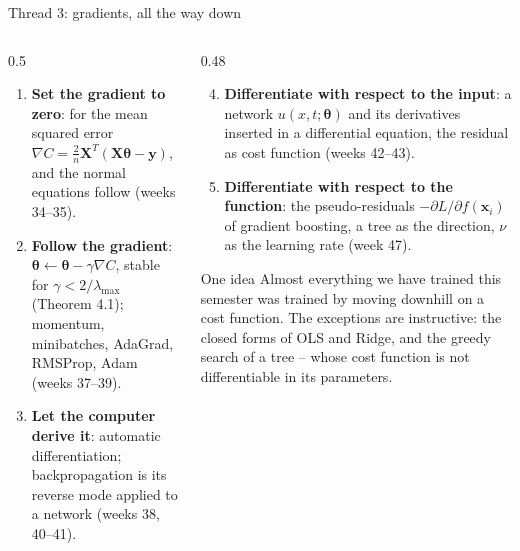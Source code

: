 \documentclass[10pt,aspectratio=169]{beamer}
\begin{document}
\begin{frame}{Thread 3: gradients, all the way down}
\begin{columns}[T]
\begin{column}{0.5\textwidth}
\small
\begin{enumerate}
  \item \textbf{Set the gradient to zero}: for the mean squared error
    $\nabla C=\frac2n\bm{X}^T(\bm{X}\bm{\theta}-\bm{y})$, and the normal
    equations follow (weeks 34--35).
  \item \textbf{Follow the gradient}:
    $\bm{\theta}\leftarrow\bm{\theta}-\gamma\nabla C$, stable for
    $\gamma<2/\lambda_{\max}$ (Theorem 4.1); momentum, minibatches,
    AdaGrad, RMSProp, Adam (weeks 37--39).
  \item \textbf{Let the computer derive it}: automatic differentiation;
    backpropagation is its reverse mode applied to a network (weeks 38,
    40--41).
\end{enumerate}
\end{column}
\begin{column}{0.48\textwidth}
\small
\begin{enumerate}\setcounter{enumi}{3}
  \item \textbf{Differentiate with respect to the input}: a network
    $u(x,t;\bm{\theta})$ and its derivatives inserted in a differential
    equation, the residual as cost function (weeks 42--43).
  \item \textbf{Differentiate with respect to the function}: the
    pseudo-residuals $-\partial L/\partial f(\bm{x}_i)$ of gradient
    boosting, a tree as the direction, $\nu$ as the learning rate
    (week 47).
\end{enumerate}
\begin{block}{One idea}
\footnotesize
Almost everything we have trained this semester was trained by moving
downhill on a cost function.  The exceptions are instructive: the closed
forms of OLS and Ridge, and the greedy search of a tree -- whose cost
function is not differentiable in its parameters.
\end{block}
\end{column}
\end{columns}
\end{frame}
\end{document}
